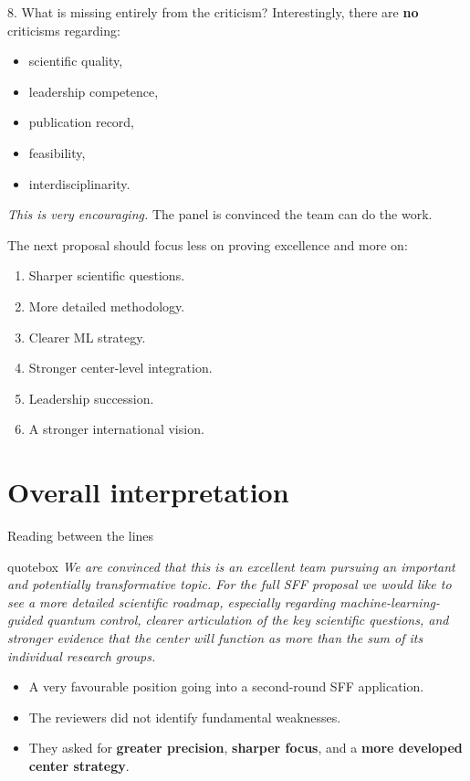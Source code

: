 \documentclass[10pt,aspectratio=169]{beamer}
\newcommand{\reviewerquote}[1]{%
  \begin{beamercolorbox}[sep=6pt,rounded=true,shadow=true]{quotebox}%
  \itshape #1%
  \end{beamercolorbox}%
}
\begin{document}
\begin{frame}{8. What is missing entirely from the criticism?}
  Interestingly, there are \textbf{no} criticisms regarding:
  \begin{itemize}
    \item scientific quality,
    \item leadership competence,
    \item publication record,
    \item feasibility,
    \item interdisciplinarity.
  \end{itemize}
  \vfill
  \begin{center}
    \emph{This is very encouraging.} The panel is convinced the team can do the work.
  \end{center}
  \vfill
  \begin{block}{The next proposal should focus less on proving excellence and more on:}
    \begin{enumerate}
      \item Sharper scientific questions.
      \item More detailed methodology.
      \item Clearer ML strategy.
      \item Stronger center-level integration.
      \item Leadership succession.
      \item A stronger international vision.
    \end{enumerate}
  \end{block}
\end{frame}

\section{Overall interpretation}

\begin{frame}{Reading between the lines}
  \reviewerquote{We are convinced that this is an excellent team pursuing an important and
  potentially transformative topic. For the full SFF proposal we would like to see a more
  detailed scientific roadmap, especially regarding machine-learning-guided quantum control,
  clearer articulation of the key scientific questions, and stronger evidence that the center
  will function as more than the sum of its individual research groups.}
  \vfill
  \begin{itemize}
    \item A very favourable position going into a second-round SFF application.
    \item The reviewers did not identify fundamental weaknesses.
    \item They asked for \textbf{greater precision}, \textbf{sharper focus}, and a
          \textbf{more developed center strategy}.
  \end{itemize}
\end{frame}
\end{document}
